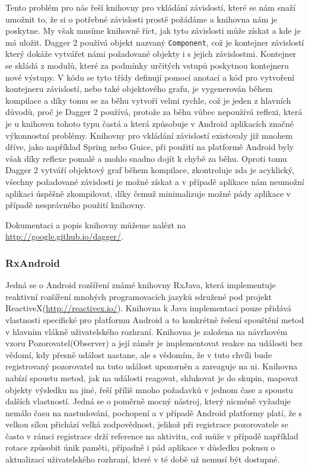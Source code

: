 \documentclass[czech,master,public,dept460,male,java,cpdeclaration]{diploma}
\begin{document}
Tento problém pro nás řeší knihovny pro vkládání závislostí, které se nám snaží umožnit to, že si o potřebné
závislosti prostě požádáme a knihovna nám je poskytne. My však musíme knihovně říct, jak tyto závislosti může
získat a kde je má uložit. Dagger 2 používá objekt nazvaný \texttt{Component}, což je kontejner závislostí
který dokáže vytvářet námi požadované objekty i s jejich závislostmi. Kontejner se skládá z modulů, které
za podmínky určitých vstupů poskytnou kontejneru nové výstupy. V kódu se tyto třídy definují pomocí anotací
a kód pro vytvoření kontejneru závislostí, nebo také objektového grafu, je vygenerován během kompilace
a díky tomu se za běhu vytvoří velmi rychle, což je jeden z hlavních důvodů, proč je Dagger 2 používá,
protože za běhu vůbec nepoužívá reflexi, která je u knihoven tohoto typu častá a která způsobuje v Android
aplikacích značné výkonnostní problémy. Knihovny pro vkládání závislostí existovaly již mnohem dříve,
jako například Spring nebo Guice, při použití na platformě Android byly však díky reflexe pomalé a mohlo snadno
dojít k chybě za běhu. Oproti tomu Dagger 2 vytváří objektový graf během kompilace, zkontroluje zda je acyklický,
všechny požadované závislosti je možné získat a v případě aplikace nám neumožní aplikaci úspěšně zkompilovat,
díky čemuž minimalizuje možné pády aplikace v případě nesprávného použití knihovny.

Dokumentaci a popis knihovny můžeme nalézt na \url{http://google.github.io/dagger/}.

\subsubsection{RxAndroid}\label{rxandroid}
Jedná se o Android rozšíření známé knihovny RxJava, která implementuje reaktivní rozšíření
mnohých programovacích jazyků sdružené pod projekt ReactiveX(\url{http://reactivex.io/}).
Knihovna k Java implementaci pouze přidává vlastnosti specifické pro platformu Android a to konkrétně
řešení spouštění metod v hlavním vlákně uživatelského rozhraní. Knihovna je založena na návrhovém
vzoru Pozorovatel(Observer) a její záměr je implementovat reakce na události bez vědomí, kdy přesně
událost nastane, ale s vědomím, že v tuto chvíli bude registrovaný pozorovatel na tuto událost
upozorněn a zareaguje na ni. Knihovna nabízí spoustu metod, jak na události reagovat, shlukovat je do
skupin, mapovat objekty výsledku na jiné, řeší příliš mnoho požadavků v jednom čase a spoustu dalších vlastností.
Jedná se o poměrně mocný nástroj, který nicméně vyžaduje nemálo času na nastudování, pochopení a v případě
Android platformy platí, že s velkou sílou přichází velká zodpovědnost, jelikož při registrace pozorovatele
se často v rámci registrace drží reference na aktivitu, což může v případě například rotace způsobit únik paměti,
případně i pád aplikace v důsledku pokusu o aktualizaci uživatelského rozhraní, které v té době už nemusí být dostupné.
\end{document}
